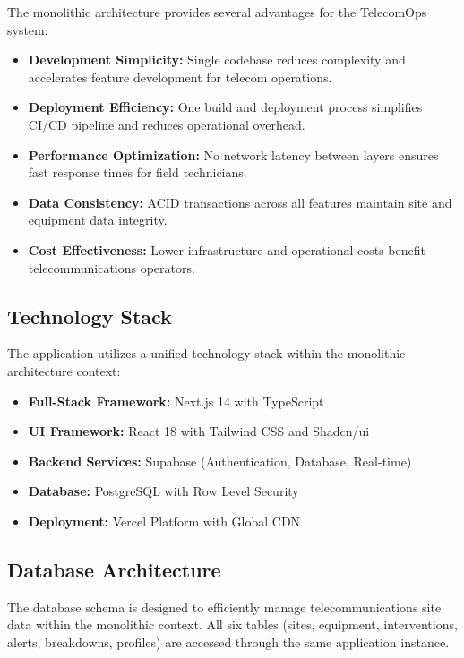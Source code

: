 The monolithic architecture provides several advantages for the TelecomOps system:

\begin{itemize}
\item \textbf{Development Simplicity:} Single codebase reduces complexity and accelerates feature development for telecom operations.
\item \textbf{Deployment Efficiency:} One build and deployment process simplifies CI/CD pipeline and reduces operational overhead.
\item \textbf{Performance Optimization:} No network latency between layers ensures fast response times for field technicians.
\item \textbf{Data Consistency:} ACID transactions across all features maintain site and equipment data integrity.
\item \textbf{Cost Effectiveness:} Lower infrastructure and operational costs benefit telecommunications operators.
\end{itemize}

\subsection{Technology Stack}
The application utilizes a unified technology stack within the monolithic architecture context:

\begin{itemize}
\item \textbf{Full-Stack Framework:} Next.js 14 with TypeScript
\item \textbf{UI Framework:} React 18 with Tailwind CSS and Shadcn/ui
\item \textbf{Backend Services:} Supabase (Authentication, Database, Real-time)
\item \textbf{Database:} PostgreSQL with Row Level Security
\item \textbf{Deployment:} Vercel Platform with Global CDN
\end{itemize}

\subsection{Database Architecture}
The database schema is designed to efficiently manage telecommunications site data within the monolithic context. All six tables (sites, equipment, interventions, alerts, breakdowns, profiles) are accessed through the same application instance.

